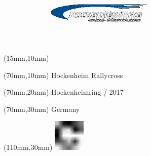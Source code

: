 \null\newpage
\begin{textblock*}{50mm}(15mm,10mm)%
\includegraphics[width=50mm]{LG/HOC.png}
\end{textblock*}
\begin{textblock*}{130mm}(70mm,10mm)%
{\fontsize{20}{20}\selectfont Hockenheim Rallycross}\\
\end{textblock*}
\begin{textblock*}{120mm}(70mm,20mm)%
{\fontsize{16}{16}\selectfont Hockenheimring / 2017}\\
\end{textblock*}
\begin{textblock*}{120mm}(70mm,30mm)%
{\fontsize{12}{12}\selectfont Germany}
\end{textblock*}
\begin{textblock*}{30mm}(110mm,30mm)%
\centering
\includegraphics[height=15mm]{icons/fa-rotate-right.pdf}
\end{textblock*}

